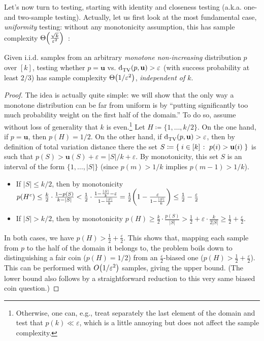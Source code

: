 \documentclass[11pt]{article}
\newcommand{\dst}{\varepsilon}
\newcommand{\ab}{k}
\renewcommand{\eqdef}{\coloneqq}
\newcommand{\p}{p}
\renewcommand{\uniform}{\mathbf{u}}
\begin{document}
Let's now turn to testing, starting with identity and closeness testing (a.k.a. one- and two-sample testing). Actually, let us first look at the most fundamental case, \emph{uniformity} testing: without any monotonicity assumption, this has sample complexity $\bigTheta{\frac{\sqrt{\ab}}{\dst^2}}$~\cite{Paninski:08,VV:17}:
\begin{theorem}\label{theo:testing:uniformity:monotone}
  Given i.i.d. samples from an arbitrary \emph{monotone non-increasing} distribution $\p$ over $[\ab]$, testing whether $\p=\uniform$ vs. $\totalvardist{\p}{\uniform} > \dst$ (with success probability at least $2/3$) has sample complexity $\bigTheta{1/\dst^2}$, \emph{independent of $\ab$}. 
\end{theorem}
\begin{proof}
  The idea is actually quite simple: we will show that the only way a monotone distribution can be far from uniform is by ``putting significantly too much probability weight on the first half of the domain.'' To do so, assume without loss of generality that $\ab$ is even.\footnote{Otherwise, one can, e.g., treat separately the last element of the domain and test that $\p(\ab) \ll \dst$, which is a little annoying but does not affect the sample complexity.} Let $H\eqdef \{1,\dots,\ab/2\}$. On the one hand, if $\p=\uniform$, then $\p(H) = 1/2$. On the other hand, if $\totalvardist{\p}{\uniform} > \dst$, then by definition of total variation distance there the set $S\eqdef \setOfSuchThat{ i \in [\ab] }{ \p(i) > \uniform(i) }$ is such that $\p(S) > \uniform(S)+\dst = |S|/\ab+\dst$. By monotonicity, this set $S$ is an interval of the form $\{1,\dots,|S|\}$ (since $\p(m) > 1/\ab$ implies $\p(m-1) > 1/\ab$).
\begin{itemize}
  \item If $|S| \leq \ab/2$, then by monotonicity $\p(H^c) \leq \frac{\ab}{2}\cdot \frac{1-\p(S)}{\ab-|S|} < \frac{1}{2}\cdot \frac{1-\frac{|S|}{\ab}-\dst}{1-\frac{|S|}{\ab}}
  = \frac{1}{2} \mleft(1-\frac{\dst}{1-\frac{|S|}{\ab}}\mright) \leq \frac{1}{2} - \frac{\dst}{2}$
  \item If $|S| > \ab/2$, then by monotonicity $\p(H) \geq \frac{\ab}{2}\cdot \frac{\p(S)}{|S|} > \frac{1}{2} + \dst\cdot \frac{\ab}{2|S|} \geq \frac{1}{2} + \frac{\dst}{2}$.
\end{itemize}
In both cases, we have $\p(H) > \frac{1}{2} + \frac{\dst}{2}$. This shows that, mapping each sample from $\p$ to the half of the domain it belongs to, the problem boils down to distinguishing a fair coin ($\p(H) = 1/2$) from an $\frac{\dst}{2}$-biased one ($\p(H) > \frac{1}{2} + \frac{\dst}{2}$). This can be performed with $\bigO{1/\dst^2}$ samples, giving the upper bound. (The lower bound also follows by a straightforward reduction to this very same biased coin question.)
\end{proof}
\end{document}
